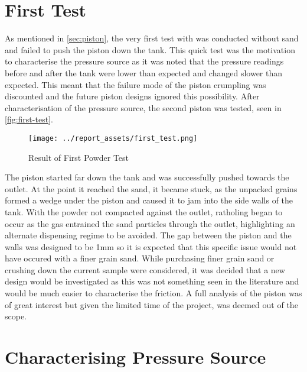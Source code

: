 \section{First Test}\label{sec:first-test}
As mentioned in \autoref{sec:piston}, the very first test with was conducted without sand and failed to push the piston down the tank. This quick test was the motivation to characterise the pressure source as it was noted that the pressure readings before and after the tank were lower than expected and changed slower than expected. This meant that the failure mode of the piston crumpling was discounted and the future piston designs ignored this possibility. After characterisation of the pressure source, the second piston was tested, seen in \autoref{fig:first-test}. 

\begin{figure}[htbp]
    \centering
    
    \begin{minipage}{0.6\textwidth}
        \centering
        \texttt{[image: ../report\_assets/first\_test.png]}
        \caption{Result of First Powder Test}\label{fig:first-test}
    \end{minipage}
    
\end{figure}
The piston started far down the tank and was successfully pushed towards the outlet. At the point it reached the sand, it became stuck, as the unpacked grains formed a wedge under the piston and caused it to jam into the side walls of the tank. With the powder not compacted against the outlet, ratholing began to occur as the gas entrained the sand particles through the outlet, highlighting an alternate dispensing regime to be avoided. The gap between the piston and the walls was designed to be 1mm so it is expected that this specific issue would not have occured with a finer grain sand. While purchasing finer grain sand or crushing down the current sample were considered, it was decided that a new design would be investigated as this was not something seen in the literature and would be much easier to characterise the friction. A full analysis of the piston was of great interest but given the limited time of the project, was deemed out of the scope. 

\section{Characterising Pressure Source}\label{sec:static_test}
